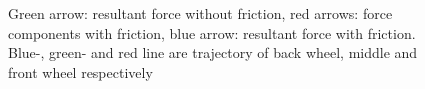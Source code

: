 \documentclass[default,iicol]{sn-jnl}
\theoremstyle{thmstyleone}%
\theoremstyle{thmstyletwo}%
\theoremstyle{thmstylethree}%
\begin{document}
\begin{figure}[t]
  \protect\newline
  \centering
  \captionsetup{singlelinecheck=off}
  \vspace{-0.2cm}\caption[Ollie motion cues]{
    Green arrow: resultant force without friction, red arrows: force components
    with friction, blue arrow: resultant force with friction. Blue-, green- and
    red line are trajectory of back wheel, middle and front wheel respectively
}
\end{figure}
\end{document}
